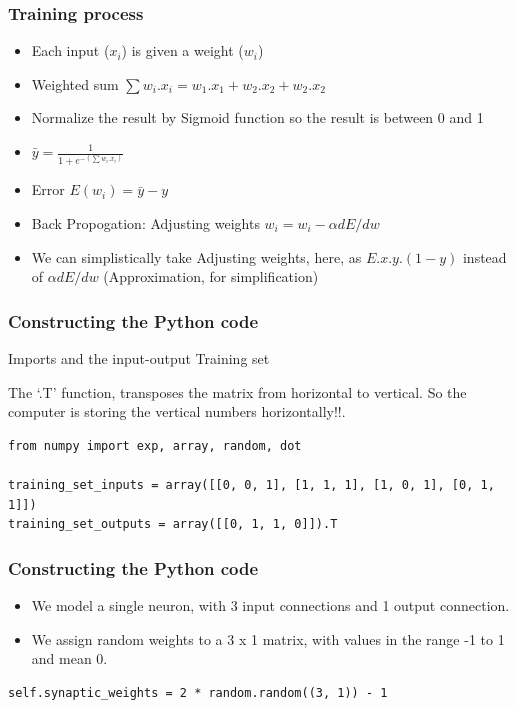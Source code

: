 \begin{frame}[fragile] \frametitle{Training process}

\begin{itemize}
\item Each input ($x_i$) is given a weight ($w_i$)
\item Weighted sum $\sum w_i . x_i = w_1 . x_1 + w_2 . x_2 + w_2 . x_2$
\item Normalize the result by Sigmoid function so the result is between 0 and 1 
\item $\bar{y} = \frac{1}{1 + e^{-(\sum w_i . x_i )}}$
\item Error $E(w_i) = \bar{y} - y$ 
\item Back Propogation: Adjusting weights $w_i = w_i - \alpha dE/dw$
\item We can simplistically take Adjusting weights, here, as $E.x.y.(1 - y)$ instead of $\alpha dE/dw$ (Approximation, for simplification)
\end{itemize}
\end{frame}

\begin{frame}[fragile] \frametitle{Constructing the Python code}
Imports and the input-output Training set

The `.T' function, transposes the matrix from horizontal to vertical. So the computer is storing the vertical numbers horizontally!!.
\begin{lstlisting}
from numpy import exp, array, random, dot

training_set_inputs = array([[0, 0, 1], [1, 1, 1], [1, 0, 1], [0, 1, 1]])
training_set_outputs = array([[0, 1, 1, 0]]).T
\end{lstlisting}
\end{frame}

\begin{frame}[fragile] \frametitle{Constructing the Python code}
\begin{itemize}
\item We model a single neuron, with 3 input connections and 1 output connection.
\item We assign random weights to a 3 x 1 matrix, with values in the range -1 to 1 and mean 0.
\end{itemize}
\begin{lstlisting}
self.synaptic_weights = 2 * random.random((3, 1)) - 1
\end{lstlisting}
\end{frame}

